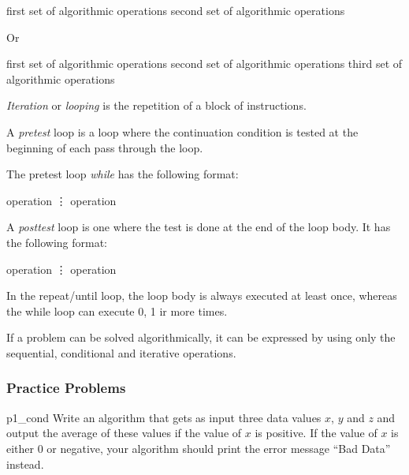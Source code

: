 \begin{algorithmic}
		\State first set of algorithmic operations
	\Else
		\State second set of algorithmic operations
	\EndIf
\end{algorithmic}

Or 
\begin{algorithmic}
		\State first set of algorithmic operations
		\State second set of algorithmic operations
	\Else 	
		\State third set of algorithmic operations
	\EndIf
\end{algorithmic}
\emph{Iteration} or \emph{looping} is the repetition of a block of instructions. 

A \emph{pretest} loop is a loop where the continuation condition is tested at the beginning of each pass through the loop. 

The pretest loop \emph{while} has the following format:

\begin{algorithmic}
	\State operation
	\State \vdots
	\State operation
	\EndWhile	
\end{algorithmic}

A \emph{posttest} loop is one where the test is done at the end of the loop body. It has the following format:

\begin{algorithmic}
	\Repeat
		\State operation
		\State \vdots
		\State operation
\end{algorithmic}

\begin{remark}
In the repeat/until loop, the loop body is always executed at least once, whereas the while loop can execute 0, 1 ir more times.
\end{remark}

\begin{remark}
If a problem can be solved algorithmically, it can be expressed by using only the sequential, conditional and iterative operations.
\end{remark}

\subsubsection{Practice Problems}

\begin{problem}{}{p1_cond}
Write an algorithm that gets as input three data values $x$, $y$ and $z$ and output the average of these values if the value of $x$ is positive. If the value of $x$ is either 0 or negative, your algorithm should print the error message ``Bad Data'' instead.
\end{problem}

